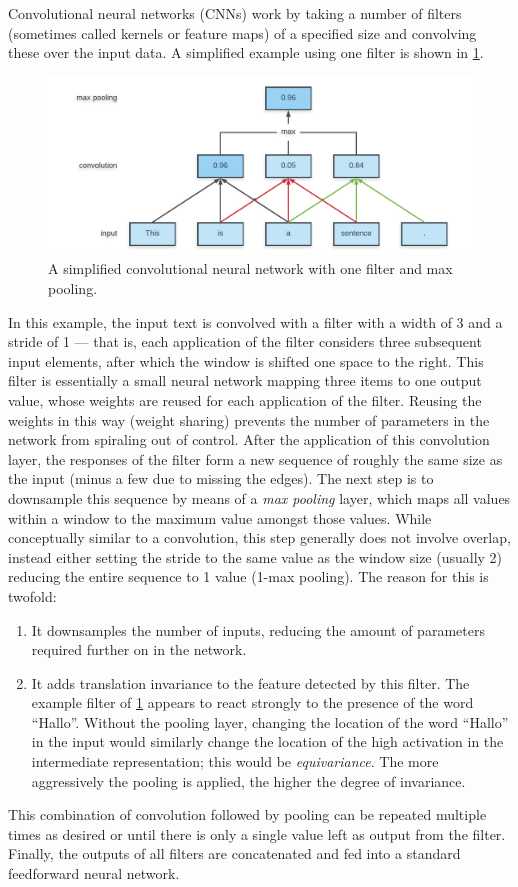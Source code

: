 Convolutional neural networks (CNNs) work by taking a number of filters
(sometimes called kernels or feature maps) of a specified size and convolving
these over the input data. A simplified example using one filter is shown in
\cref{fig:cnn}.
\begin{figure}[tb]
  \centering
  \includegraphics[width=\textwidth]{figures/cnn.pdf}
  \caption{A simplified convolutional neural network with one filter and
  max pooling.\label{fig:cnn}}
\end{figure}
In this example, the input text is convolved with a filter with a width of 3 and
a stride of 1 --- that is, each application of the filter considers three
subsequent input elements, after which the window is shifted one space to the
right. This filter is essentially a small neural network mapping three items to
one output value, whose weights are reused for each application of the filter.
Reusing the weights in this way (weight sharing) prevents the number of
parameters in the network from spiraling out of control.
\citep{lecun1995convolutional} After the application of this convolution layer,
the responses of the filter form a new sequence of roughly the same size as the
input (minus a few due to missing the edges). The next step is to downsample
this sequence by means of a \emph{max pooling} layer, which maps all values
within a window to the maximum value amongst those values. While conceptually
similar to a convolution, this step generally does not involve overlap, instead
either setting the stride to the same value as the window size (usually 2)
reducing the entire sequence to 1 value (1-max pooling). The reason for this is
twofold:
\begin{enumerate}
\item It downsamples the number of inputs, reducing the amount of parameters
  required further on in the network.
\item It adds translation invariance to the feature detected by this filter. The
  example filter of \cref{fig:cnn} appears to react strongly to the
  presence of the word ``Hallo''. Without the pooling layer, changing the
  location of the word ``Hallo'' in the input would similarly change the
  location of the high activation in the intermediate representation; this would
  be \emph{equivariance}. The more aggressively the pooling is applied, the
  higher the degree of invariance.
\end{enumerate}
This combination of convolution followed by pooling can be repeated multiple
times as desired or until there is only a single value left as output from the
filter. Finally, the outputs of all filters are concatenated and fed into a
standard feedforward neural network.

